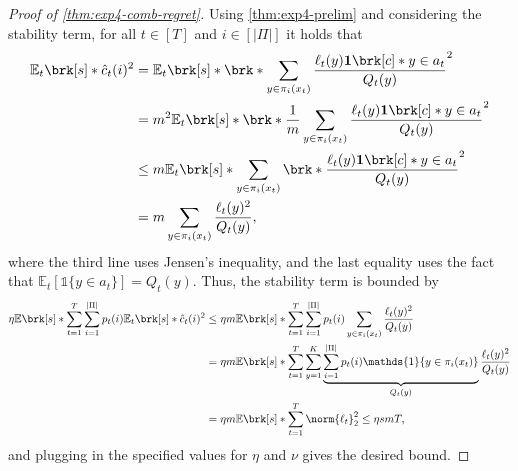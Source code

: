 \documentclass[11pt]{article}
\renewcommand{\ind}[1]{\mathds{1}\{#1\}}
\newcommand{\bbE}{\boldsymbol{\mathbb{E}}}
\renewcommand{\E}{\bbE}
\newcommand{\pred}{a}
\newcommand{\lab}{y}
\theoremstyle{plain}
\begin{document}
\begin{proof}[Proof of \cref{thm:exp4-comb-regret}]
    Using \cref{thm:exp4-prelim} and considering the stability term, for all $t \in [T]$ and $i \in [|\Pi|]$ it holds that
    \begin{align*}\allowdisplaybreaks
        \E_t \brk[s]*{\hat c_t(i)^2} 
        &=
        \E_t \brk[s]*{\brk*{\sum_{\lab \in \pi_i(x_t)} \frac{\ell_t(\lab) \mathbf{1} \brk[c]*{\lab \in \pred_t}}{Q_t(\lab)}}^2} \\
        &=
        m^2 \E_t \brk[s]*{\brk*{\frac{1}{m} \sum_{\lab \in \pi_i(x_t)} \frac{\ell_t(\lab) \mathbf{1} \brk[c]*{\lab \in \pred_t}}{Q_t(\lab)}}^2}  \\
        &\leq
        m \E_t \brk[s]*{\sum_{\lab \in \pi_i(x_t)} \brk*{\frac{\ell_t(\lab) \mathbf{1} \brk[c]*{\lab \in \pred_t}}{Q_t(\lab)}}^2} \\
        &=
        m \sum_{\lab \in \pi_i(x_t)} \frac{\ell_t(\lab)^2}{Q_t(\lab)},
    \end{align*}
    where the third line uses Jensen's inequality, and the last equality uses the fact that $\E_t[\ind{\lab \in \pred_t}] = Q_t(\lab)$. Thus, the stability term is bounded by
    \begin{align*}
        \eta \E \brk[s]*{\sum_{t=1}^T \sum_{i=1}^{|\Pi|}  p_t(i) \E_t \brk[s]*{ \hat c_t(i)^2 }} &\leq
        \eta m \E \brk[s]*{\sum_{t=1}^T \sum_{i=1}^{|\Pi|} p_t(i) \sum_{\lab \in \pi_i(x_t)} \frac{\ell_t(\lab)^2}{Q_t(\lab)}} \\
        &=
        \eta m \E \brk[s]*{\sum_{t=1}^T \sum_{\lab=1}^K \underbrace{\sum_{i=1}^{|\Pi|} p_t(i) \ind{\lab \in \pi_i(x_t)}}_{Q_t(\lab)} \frac{\ell_t(\lab)^2}{Q_t(\lab)}} \\
        &=
        \eta m \E \brk[s]*{\sum_{t=1}^T \norm{\ell_t}_2^2}
        \leq \eta s m T,
    \end{align*}
    and plugging in the specified values for $\eta$ and $\nu$ gives the desired bound.
\end{proof}

\end{document}
